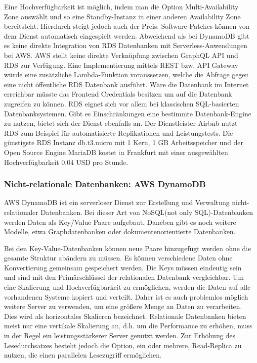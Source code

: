 Eine Hochverfügbarkeit ist möglich, indem man die Option Multi-Availability Zone auswählt und so eine Standby-Instanz in einer anderen Availability Zone bereitsteht.
Hierdurch steigt jedoch auch der Preis. Software-Patches können von dem Dienst automatisch eingespielt werden.
Abweichend als bei DynamoDB gibt es keine direkte Integration von RDS Datenbanken mit Serverless-Anwendungen bei AWS.
AWS stellt keine direkte Verknüpfung zwischen GraphQL API und RDS zur Verfügung. Eine Implementierung mittels REST bzw. API Gateway würde eine zusätzliche Lambda-Funktion voraussetzen, welche
die Abfrage gegen eine nicht öffentliche RDS Datenbank ausführt. Wäre die Datenbank im Internet erreichbar müsste das Frontend Credentials besitzen um auf die Datenbank zugreifen zu können.
RDS eignet sich vor allem bei klassischen SQL-basierten Datenbanksystemen. Gibt es Einschränkungen eine bestimmte Datenbank-Engine zu nutzen, bietet sich der Dienst ebenfalls an.
Der Dienstleister Airbnb nutzt RDS zum Beispiel für automatisierte Replikationen und Leistungstests.
Die günstigste RDS Instanz \glqq db.t3.micro\grqq{} mit 1 Kern, 1 GB Arbeitsspeicher und der Open Source Engine MariaDB kostet in Frankfurt mit einer ausgewählten Hochverfügbarkeit 0,04 USD pro Stunde. \cite{RDS}


\subsubsection{Nicht-relationale Datenbanken: AWS DynamoDB}
\label{DynamoDB}

AWS DynamoDB ist ein serverloser Dienst zur Erstellung und Verwaltung nicht-relationaler Datenbanken.
Bei dieser Art von NoSQL(not only SQL)-Datenbanken werden Daten als Key/Value Paare aufgebaut. Daneben gibt es noch weitere Modelle, etwa Graphdatenbanken oder dokumentenorientierte
Datenbanken.

Bei den Key-Value-Datenbanken können neue Paare hinzugefügt werden ohne die gesamte Struktur abändern zu müssen.
Es können verschiedene Daten ohne Konvertierung gemeinsam gespeichert werden.
Die Keys müssen eindeutig sein und sind mit den Primärschlüssel der relationalen Datenbank vergleichbar.
Um eine Skalierung und Hochverfügbarkeit zu ermöglichen, werden die Daten auf alle vorhandenen Systeme kopiert und verteilt. Daher ist es auch problemlos möglich weitere
Server zu verwenden, um eine größere Menge an Daten zu verarbeiten. Dies wird als horizontales Skalieren bezeichnet.
Relationale Datenbanken bieten meist nur eine vertikale Skalierung an, d.h. um die Performance zu erhöhen, muss in der Regel ein leistungsstärkerer Server genutzt werden.
Zur Erhöhung des Lesedurchsatzes besteht jedoch die Option, ein oder mehrere, Read-Replica zu nutzen, die einen parallelen Lesezugriff ermöglichen.

